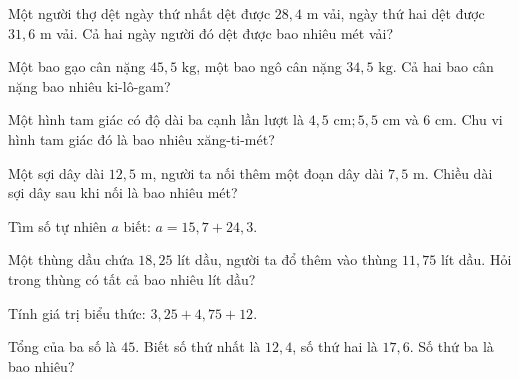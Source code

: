 \begin{ex}
  Một người thợ dệt ngày thứ nhất dệt được $28{,}4\text{ m}$ vải, ngày thứ hai dệt được $31{,}6\text{ m}$ vải. Cả hai ngày người đó dệt được bao nhiêu mét vải?
\end{ex}

\begin{ex}
  Một bao gạo cân nặng $45{,}5\text{ kg}$, một bao ngô cân nặng $34{,}5\text{ kg}$. Cả hai bao cân nặng bao nhiêu ki-lô-gam?
\end{ex}

\begin{ex}
  Một hình tam giác có độ dài ba cạnh lần lượt là $4{,}5\text{ cm}; 5{,}5\text{ cm}$ và $6\text{ cm}$. Chu vi hình tam giác đó là bao nhiêu xăng-ti-mét?
\end{ex}

\begin{ex}
  Một sợi dây dài $12{,}5\text{ m}$, người ta nối thêm một đoạn dây dài $7{,}5\text{ m}$. Chiều dài sợi dây sau khi nối là bao nhiêu mét?
\end{ex}

\begin{ex}
  Tìm số tự nhiên $a$ biết: $a = 15{,}7 + 24{,}3$.
\end{ex}

\begin{ex}
  Một thùng dầu chứa $18{,}25$ lít dầu, người ta đổ thêm vào thùng $11{,}75$ lít dầu. Hỏi trong thùng có tất cả bao nhiêu lít dầu?
\end{ex}

\begin{ex}
  Tính giá trị biểu thức: $3{,}25 + 4{,}75 + 12$.
\end{ex}

\begin{ex}
  Tổng của ba số là $45$. Biết số thứ nhất là $12{,}4$, số thứ hai là $17{,}6$. Số thứ ba là bao nhiêu?
\end{ex}

